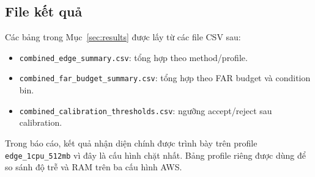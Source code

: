 \subsection{File kết quả}

Các bảng trong Mục~\ref{sec:results} được lấy từ các file CSV sau:

\begin{itemize}
    \item \texttt{combined\_edge\_summary.csv}: tổng hợp theo method/profile.
    \item \texttt{combined\_far\_budget\_summary.csv}: tổng hợp theo FAR budget và condition bin.
    \item \texttt{combined\_calibration\_thresholds.csv}: ngưỡng accept/reject sau calibration.
\end{itemize}

Trong báo cáo, kết quả nhận diện chính được trình bày trên profile \texttt{edge\_1cpu\_512mb} vì đây là cấu hình chặt nhất. Bảng profile riêng được dùng để so sánh độ trễ và RAM trên ba cấu hình AWS.
